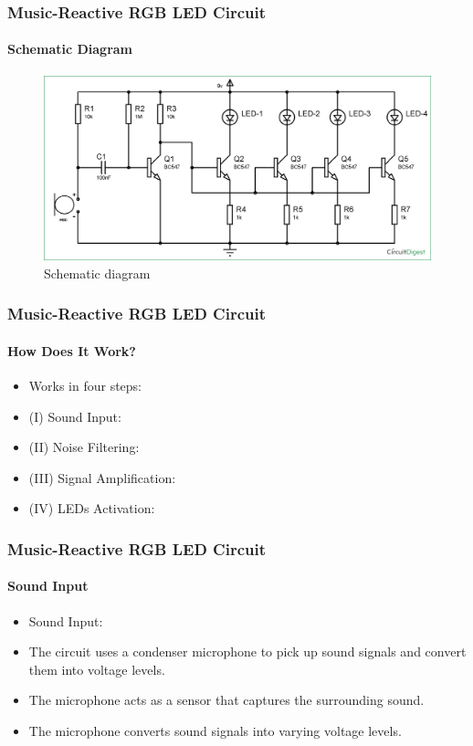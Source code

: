 \documentclass{beamer}
\begin{document}
\begin{frame}
\frametitle{Music-Reactive RGB LED Circuit}
\framesubtitle{Schematic Diagram}
\begin{figure}
  \centering
  \includegraphics[scale=0.27]{image1.png}
  \caption{Schematic diagram}
  \label{fig:image1}
\end{figure}
\end{frame}

\begin{frame}
\frametitle{Music-Reactive RGB LED Circuit}
\framesubtitle{How Does It Work?}
\begin{itemize}
\item Works in four steps:
 \item (I) Sound Input:
 \item (II) Noise Filtering:
 \item (III) Signal Amplification:
 \item (IV) LEDs Activation:
  
  
\end{itemize}
\end{frame}

\begin{frame}
\frametitle{Music-Reactive RGB LED Circuit}
\framesubtitle{Sound Input}
\begin{itemize}
  \item Sound Input:
  \item The circuit uses a condenser microphone to pick up sound signals and convert them into voltage levels.
  \item  The microphone acts as a sensor that captures the surrounding sound.
  \item The microphone converts sound signals into varying voltage levels.
  
\end{itemize}
\end{frame}
\end{document}
